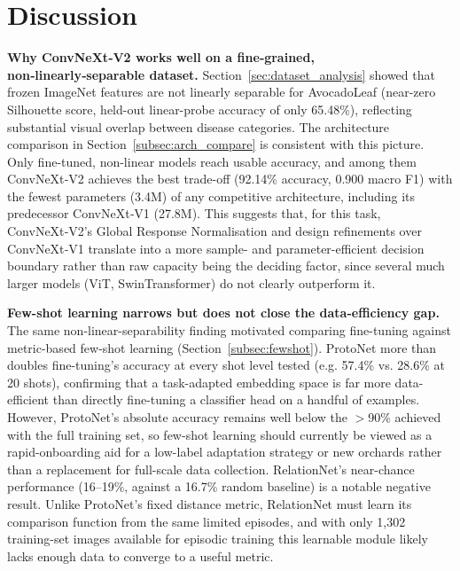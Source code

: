 \section{Discussion}
\label{sec:discussion}

\textbf{Why ConvNeXt‑V2 works well on a fine‑grained, non‑linearly‑separable dataset.} Section~\ref{sec:dataset_analysis} showed that frozen ImageNet features are not linearly separable for AvocadoLeaf (near-zero Silhouette score, held-out linear-probe accuracy of only 65.48\%), reflecting substantial visual overlap between disease categories. The architecture comparison in Section~\ref{subsec:arch_compare} is consistent with this picture. Only fine-tuned, non-linear models reach usable accuracy, and among them ConvNeXt‑V2 achieves the best trade-off (92.14\% accuracy, 0.900 macro F1) with the fewest parameters (3.4M) of any competitive architecture, including its predecessor ConvNeXt‑V1 (27.8M). This suggests that, for this task, ConvNeXt‑V2's Global Response Normalisation and design refinements over ConvNeXt‑V1 translate into a more sample- and parameter-efficient decision boundary rather than raw capacity being the deciding factor, since several much larger models (ViT, SwinTransformer) do not clearly outperform it.

\textbf{Few-shot learning narrows but does not close the data-efficiency gap.} The same non-linear-separability finding motivated comparing fine-tuning against metric-based few-shot learning (Section~\ref{subsec:fewshot}). ProtoNet more than doubles fine-tuning's accuracy at every shot level tested (e.g. 57.4\% vs. 28.6\% at 20 shots), confirming that a task-adapted embedding space is far more data-efficient than directly fine-tuning a classifier head on a handful of examples. However, ProtoNet's absolute accuracy remains well below the $>$90\% achieved with the full training set, so few-shot learning should currently be viewed as a rapid-onboarding aid for a low-label adaptation strategy or new orchards rather than a replacement for full-scale data collection. RelationNet's near-chance performance (16--19\%, against a 16.7\% random baseline) is a notable negative result. Unlike ProtoNet's fixed distance metric, RelationNet must learn its comparison function from the same limited episodes, and with only 1,302 training-set images available for episodic training this learnable module likely lacks enough data to converge to a useful metric.

